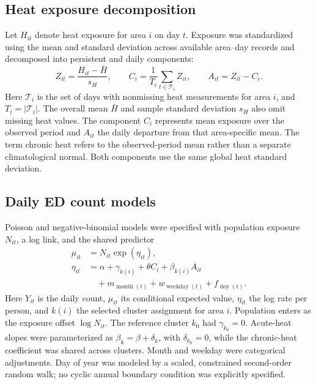 \documentclass[11pt,letterpaper]{article}
\begin{document}
\subsection{Heat exposure decomposition}
Let \(H_{it}\) denote heat exposure for area \(i\) on day \(t\). Exposure was standardized using the mean and standard deviation across available area--day records and decomposed into persistent and daily components:
\begin{equation}
Z_{it}=\frac{H_{it}-\bar H}{s_H},\qquad
C_i=\frac{1}{T_i}\sum_{t\in\mathcal T_i}Z_{it},\qquad
A_{it}=Z_{it}-C_i.
\label{eq:methods-heat}
\end{equation}
Here \(\mathcal T_i\) is the set of days with nonmissing heat measurements for area \(i\), and \(T_i=|\mathcal T_i|\). The overall mean \(\bar H\) and sample standard deviation \(s_H\) also omit missing heat values. The component \(C_i\) represents mean exposure over the observed period and \(A_{it}\) the daily departure from that area-specific mean. The term chronic heat refers to the observed-period mean rather than a separate climatological normal. Both components use the same global heat standard deviation.

\subsection{Daily ED count models}
Poisson and negative-binomial models were specified with population exposure \(N_{it}\), a log link, and the shared predictor
\begin{align}
\mu_{it}&=N_{it}\exp(\eta_{it}),\\
\eta_{it}&=\alpha+\gamma_{k(i)}+\theta C_i+\beta_{k(i)}A_{it}\nonumber\\
&\quad+m_{\operatorname{month}(t)}
+w_{\operatorname{weekday}(t)}+f_{\operatorname{doy}(t)}.
\label{eq:methods-model}
\end{align}
Here \(Y_{it}\) is the daily count, \(\mu_{it}\) its conditional expected value, \(\eta_{it}\) the log rate per person, and \(k(i)\) the selected cluster assignment for area \(i\). Population enters as the exposure offset \(\log N_{it}\). The reference cluster \(k_0\) had \(\gamma_{k_0}=0\). Acute-heat slopes were parameterized as \(\beta_k=\beta+\delta_k\), with \(\delta_{k_0}=0\), while the chronic-heat coefficient was shared across clusters. Month and weekday were categorical adjustments. Day of year was modeled by a scaled, constrained second-order random walk; no cyclic annual boundary condition was explicitly specified.
\end{document}
